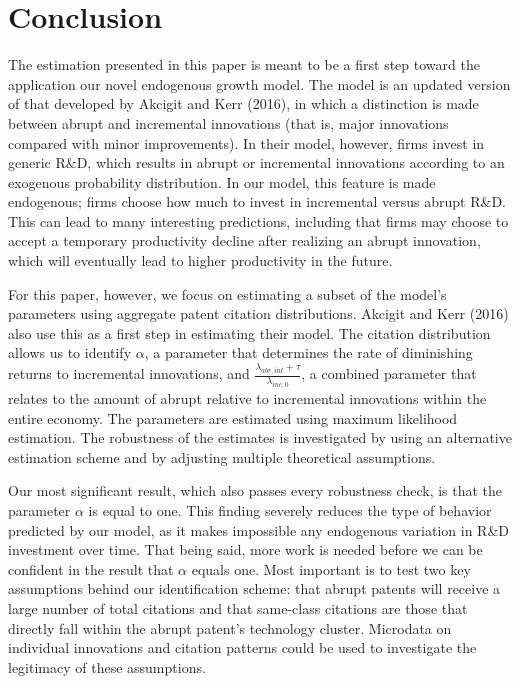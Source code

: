 \documentclass[letterpaper,12pt]{article}
\theoremstyle{definition}
\begin{document}
\section{Conclusion}\label{sec:Conclusion}
The estimation presented in this paper is meant to be a first step toward the application our novel endogenous growth model. The model is an updated version of that developed by Akcigit and Kerr (2016), in which a distinction is made between abrupt and incremental innovations (that is, major innovations compared with minor improvements). In their model, however, firms invest in generic R\&D, which results in abrupt or incremental innovations according to an exogenous probability distribution. In our model, this feature is made endogenous; firms choose how much to invest in incremental versus abrupt R\&D. This can lead to many interesting predictions, including that firms may choose to accept a temporary productivity decline after realizing an abrupt innovation, which will eventually lead to higher productivity in the future.

For this paper, however, we focus on estimating a subset of the model's parameters using aggregate patent citation distributions. Akcigit and Kerr (2016) also use this as a first step in estimating their model. The citation distribution allows us to identify $\alpha$, a parameter that determines the rate of diminishing returns to incremental innovations, and $\frac{\lambda_{abr, int} + \tau}{\lambda_{inc,0}}$, a combined parameter that relates to the amount of abrupt relative to incremental innovations within the entire economy. The parameters are estimated using maximum likelihood estimation. The robustness of the estimates is investigated by using an alternative estimation scheme and by adjusting multiple theoretical assumptions.

Our most significant result, which also passes every robustness check, is that the parameter $\alpha$ is equal to one. This finding severely reduces the type of behavior predicted by our model, as it makes impossible any endogenous variation in R\&D investment over time. That being said, more work is needed before we can be confident in the result that $\alpha$ equals one. Most important is to test two key assumptions behind our identification scheme: that abrupt patents will receive a large number of total citations and that same-class citations are those that directly fall within the abrupt patent's technology cluster. Microdata on individual innovations and citation patterns could be used to investigate the legitimacy of these assumptions.
\end{document}
